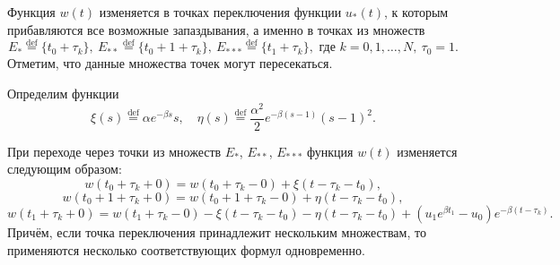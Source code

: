 Функция $w(t)$ изменяется в точках переключения функции $u_*(t)$, к которым прибавляются все возможные запаздывания, а именно в точках из множеств
%
\[E_*\stackrel{\text{def}}{=}\{t_0 + \tau_k\},\ E_{**}\stackrel{\text{def}}{=}\{t_0 + 1 + \tau_k\},\ E_{***}\stackrel{\text{def}}{=}\{t_1 + \tau_k\},\text{ где }k=0,1,\ldots,N,\ \tau_0=1.\]
%
Отметим, что данные множества точек могут пересекаться.

Определим функции 
$$\xi(s)\stackrel{\text{def}}{=}\alpha e^{-\beta s} s ,\quad \eta(s)\stackrel{\text{def}}{=}\frac{\alpha^2}{2} e^{-\beta( s-1)} (s-1)^2.$$
\begin{lemma}
	\label{lm:lem_w_*}
	При переходе через точки из множеств $E_*$, $E_{**}$, $E_{***}$ функция $w(t)$ изменяется следующим образом:
	\small
	\begin{equation}
		\label{eq:w_*}
		w(t_0 + \tau_k+0) = w(t_0 + \tau_k-0) +  \xi(t-\tau_k-t_0),
	\end{equation}
	\begin{equation}
		\label{eq:w_**}
		w(t_0 +1+ \tau_k+0) = w(t_0 +1+ \tau_k-0) +\eta(t-\tau_k-t_0), 
	\end{equation}
	\begin{equation}
		\label{eq:w_***} 
		w(t_1 + \tau_k+0) = w(t_1 + \tau_k-0)-\xi(t-\tau_k-t_0)-\eta(t-\tau_k-t_0)+
		(u_1 e^{\beta t_1}-u_0)e^{-\beta(t-\tau_k)}.
	\end{equation}
	\normalsize
	Причём, если точка переключения принадлежит нескольким множествам, то применяются несколько  соответствующих формул одновременно.
\end{lemma}

